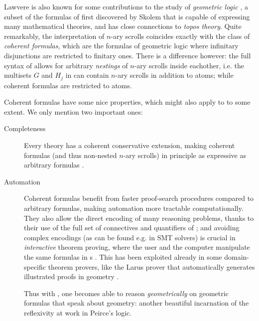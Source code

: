 Lawvere is also known for some contributions to the study of \emph{geometric
logic} , a subset of the formulas of  first
discovered by Skolem  that is capable of expressing
many mathematical theories, and has close connections to \emph{topos theory}.
Quite remarkably, the interpretation of $n$-ary scrolls coincides exactly with
the class of \emph{coherent formulas}, which are the formulas of geometric logic
where infinitary disjunctions are restricted to finitary ones. There is a
difference however: the full syntax of  allows for arbitrary \emph{nestings}
of $n$-ary scrolls inside eachother, i.e. the multisets $G$ and $H_j$ in
 can contain $n$-ary scrolls in addition to atoms; while
coherent formulas are restricted to atoms.

Coherent formulas have some nice properties, which might also apply to  to
some extent. We only mention two important ones:
\begin{description}
  \item[Completeness] Every  theory has a coherent conservative
  extension, making coherent formulas (and thus non-nested $n$-ary scrolls) in
  principle as expressive as arbitrary  formulas
  .
  
  \item[Automation] Coherent formulas benefit from faster proof-search
  procedures compared to arbitrary formulas, making automation more tractable
  computationally. They also allow the direct encoding of many reasoning
  problems, thanks to their use of the full set of connectives and quantifiers
  of ; and avoiding complex encodings (as can be found e.g. in SMT solvers)
  is crucial in \emph{interactive} theorem proving, where the user and the
  computer manipulate the same formulas in s
  . This has been exploited already in some
  domain-specific theorem provers, like the Larus prover that automatically
  generates illustrated proofs in geometry
  .
  
  \begin{remark}
  Thus with , one becomes able to reason \emph{geometrically} on geometric
  formulas that speak about geometry: another beautiful incarnation of the
  reflexivity at work in Peirce's  logic.
  \end{remark}
\end{description}


